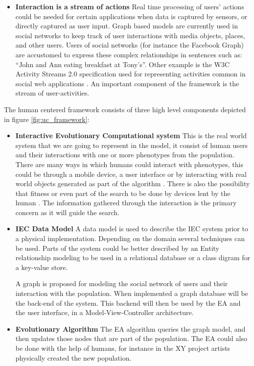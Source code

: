 \begin{itemize}
\item {\bf Interaction is a stream of actions}
  Real time processing of users' actions could be needed for certain applications when data is 
  captured by sensors, or directly captured as user input.
  Graph based models are currently used in social networks to keep track  
  of user interactions with media objects, places, and other users. Users of 
  social networks (for instance the Facebook Graph) are accustomed to express these 
  complex relationships in sentences such as: ``John and Ann eating breakfast at Tony's''. 
  Other example is the W3C Activity Streams 2.0 specification used for representing activities 
  common in social web applications \cite{json:streams}. An important component of the 
  framework is the stream of user-activities.
\end{itemize}


The human centered framework consists of three high level components depicted
in figure \ref{fig:uc_framework}:

\begin{itemize}
  \item {\bf Interactive Evolutionary Computational system} 
  This is the real world system that we are going to represent in the model, 
  it consist of human users and their interactions with one or more phenotypes
  from
  the population. There are many ways in which humans could interact 
  with phenotypes, this could be through a mobile device, a user interface 
  or by interacting with real world objects generated as part of the algorithm 
  \cite{de2014artists,de2013unplugging}. 
  There is also the possibility that fitness or even part of the search 
  to be done by devices lent by the human \cite{DBLP:conf/gecco/MereloCGCRV16}.
  The information gathered through the interaction is the primary concern
  as it will guide the search. 

  \item {\bf IEC Data Model}
  A data model is used to describe the IEC system prior to a physical 
  implementation.  Depending on the domain several techniques can be used.
  Parts of the system could be better described by an Entity relationship 
  modeling to be used in a relational database or a class digram for a 
  key-value store. 

  A graph is proposed for modeling the social network of users 
  and their interaction with the population. When implemented a graph database 
  will be the back-end of the system. This  backend will then be
  used by the EA and the user interface, in a Model-View-Controller architecture. 

  \item {\bf Evolutionary Algorithm} 
  The EA algorithm queries the graph model, and then updates those nodes that 
  are part of the population. The EA could also be done with the help of
  humans, for instance in the XY project \cite{de2013unplugging} artists physically created
  the new population.  
\end{itemize}

